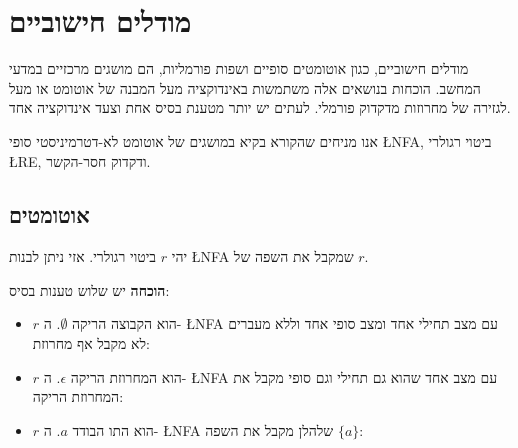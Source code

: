 
\chapter{%
מודלים חישוביים%
}\label{s.models}

מודלים חישוביים, כגון אוטומטים סופיים ושפות פורמליות, הם מושגים מרכזיים במדעי המחשב. הוכחות בנושאים אלה משתמשות באינדוקציה מעל המבנה של אוטומט או מעל לגזירה של מחרוזות מדקדוק פורמלי. לעתים יש יותר מטענת בסיס אחת וצעד אינדוקציה אחד.

אנו מניחים שהקורא בקיא במושגים של אוטומט לא-דטרמיניסטי סופי
\L{\small NFA},
ביטוי רגולרי
\L{\small RE},
ודקדוק חסר-הקשר.


\section{%
אוטומטים%
}


\begin{theorem}
יהי
$r$
ביטוי רגולרי. אזי ניתן לבנות
\L{\small NFA}
שמקבל את השפה של
$r$.
\end{theorem}

\textbf{הוכחה}
יש שלוש טענות בסיס:
\begin{itemize}
\item $r$
הוא הקבוצה הריקה
$\emptyset$. 
ה-%
\L{\small NFA}
עם מצב תחילי אחד ומצב סופי אחד וללא מעברים לא מקבל אף מחרוזת:
\begin{center}
\end{center}
\item $r$
הוא המחרוזת הריקה
$\epsilon$.
ה-%
\L{\small NFA}
עם מצב אחד שהוא גם תחילי וגם סופי מקבל את המחרוזת הריקה:
\begin{center}
\end{center}
\item $r$
הוא התו הבודד
$a$.
ה-%
\L{\small NFA}
שלהלן מקבל את השפה
$\{a\}$:
\begin{center}
\end{center}
\end{itemize}

